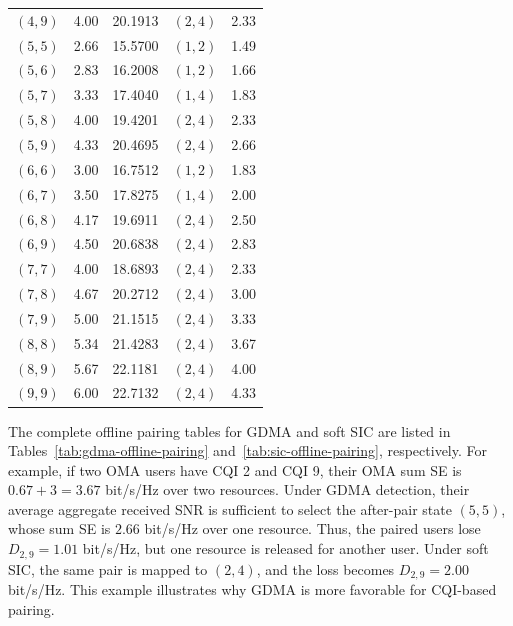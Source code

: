 \begin{table}[p]
\begin{tabular}{@{}ccccc@{}}
$(4,9)$ & 4.00 & 20.1913 & $(2,4)$ & 2.33 \\
$(5,5)$ & 2.66 & 15.5700 & $(1,2)$ & 1.49 \\
$(5,6)$ & 2.83 & 16.2008 & $(1,2)$ & 1.66 \\
$(5,7)$ & 3.33 & 17.4040 & $(1,4)$ & 1.83 \\
$(5,8)$ & 4.00 & 19.4201 & $(2,4)$ & 2.33 \\
$(5,9)$ & 4.33 & 20.4695 & $(2,4)$ & 2.66 \\
$(6,6)$ & 3.00 & 16.7512 & $(1,2)$ & 1.83 \\
$(6,7)$ & 3.50 & 17.8275 & $(1,4)$ & 2.00 \\
$(6,8)$ & 4.17 & 19.6911 & $(2,4)$ & 2.50 \\
$(6,9)$ & 4.50 & 20.6838 & $(2,4)$ & 2.83 \\
$(7,7)$ & 4.00 & 18.6893 & $(2,4)$ & 2.33 \\
$(7,8)$ & 4.67 & 20.2712 & $(2,4)$ & 3.00 \\
$(7,9)$ & 5.00 & 21.1515 & $(2,4)$ & 3.33 \\
$(8,8)$ & 5.34 & 21.4283 & $(2,4)$ & 3.67 \\
$(8,9)$ & 5.67 & 22.1181 & $(2,4)$ & 4.00 \\
$(9,9)$ & 6.00 & 22.7132 & $(2,4)$ & 4.33 \\
\bottomrule
\end{tabular}
\end{table}

The complete offline pairing tables for GDMA and soft SIC are listed in Tables~\ref{tab:gdma-offline-pairing} and~\ref{tab:sic-offline-pairing}, respectively.
For example, if two OMA users have CQI 2 and CQI 9, their OMA sum SE is $0.67+3=3.67$ bit/s/Hz over two resources. Under GDMA detection, their average aggregate received SNR is sufficient to select the after-pair state $(5,5)$, whose sum SE is $2.66$ bit/s/Hz over one resource. Thus, the paired users lose $D_{2,9}=1.01$ bit/s/Hz, but one resource is released for another user. Under soft SIC, the same pair is mapped to $(2,4)$, and the loss becomes $D_{2,9}=2.00$ bit/s/Hz. This example illustrates why GDMA is more favorable for CQI-based pairing. 

